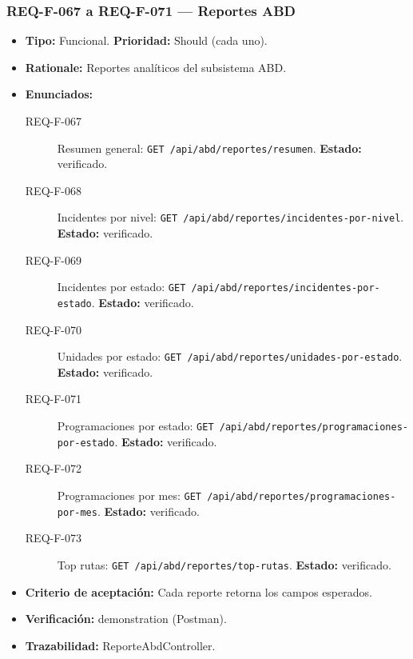 \documentclass[12pt,a4paper]{article}
\begin{document}
\subsubsection{REQ-F-067 a REQ-F-071 --- Reportes ABD}
\begin{itemize}
  \item \textbf{Tipo:} Funcional. \textbf{Prioridad:} Should (cada uno).
  \item \textbf{Rationale:} Reportes analíticos del subsistema ABD.
  \item \textbf{Enunciados:}
    \begin{description}
      \item[REQ-F-067] Resumen general: \texttt{GET /api/abd/reportes/resumen}. \textbf{Estado:} verificado.
      \item[REQ-F-068] Incidentes por nivel: \texttt{GET /api/abd/reportes/incidentes-por-nivel}. \textbf{Estado:} verificado.
      \item[REQ-F-069] Incidentes por estado: \texttt{GET /api/abd/reportes/incidentes-por-estado}. \textbf{Estado:} verificado.
      \item[REQ-F-070] Unidades por estado: \texttt{GET /api/abd/reportes/unidades-por-estado}. \textbf{Estado:} verificado.
      \item[REQ-F-071] Programaciones por estado: \texttt{GET /api/abd/reportes/programaciones-por-estado}. \textbf{Estado:} verificado.
      \item[REQ-F-072] Programaciones por mes: \texttt{GET /api/abd/reportes/programaciones-por-mes}. \textbf{Estado:} verificado.
      \item[REQ-F-073] Top rutas: \texttt{GET /api/abd/reportes/top-rutas}. \textbf{Estado:} verificado.
    \end{description}
  \item \textbf{Criterio de aceptación:} Cada reporte retorna los campos esperados.
  \item \textbf{Verificación:} demonstration (Postman).
  \item \textbf{Trazabilidad:} ReporteAbdController.
\end{itemize}

\end{document}
